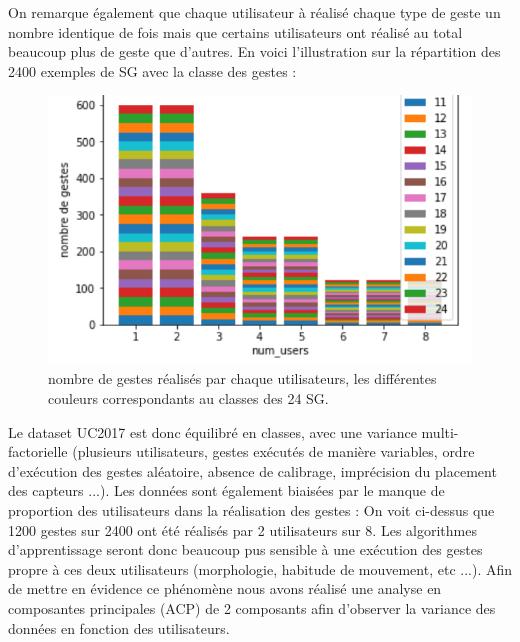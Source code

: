 \documentclass[12pt,a4paper,roman]{article}
\begin{document}
\newpage
On remarque également que chaque utilisateur à réalisé chaque type de geste un nombre identique de fois mais que certains utilisateurs ont réalisé au total beaucoup plus de geste que d'autres. En voici l'illustration sur la répartition des 2400 exemples de SG avec la classe des gestes :

\begin{figure}[h!]
\centering
\includegraphics[scale=0.5]{comptage.png}
\caption{nombre de gestes réalisés par chaque utilisateurs, les différentes couleurs correspondants au classes des 24 SG.}
\label{fig:universe}
\end{figure}

Le dataset UC2017 est donc équilibré en classes, avec une variance multi-factorielle (plusieurs utilisateurs, gestes exécutés de manière variables, ordre d'exécution des gestes aléatoire, absence de calibrage, imprécision du placement des capteurs ...). 
\newline
Les données sont également biaisées par le manque de proportion des utilisateurs dans la réalisation des gestes : On voit ci-dessus que 1200 gestes sur 2400 ont été réalisés par 2 utilisateurs sur 8. Les algorithmes d'apprentissage seront donc beaucoup pus sensible à une exécution des gestes propre à ces deux utilisateurs (morphologie, habitude de mouvement, etc ...). 
Afin de mettre en évidence ce phénomène nous avons réalisé une analyse en composantes principales (ACP) de 2 composants  afin d'observer la variance des données en fonction des utilisateurs.
\end{document}
